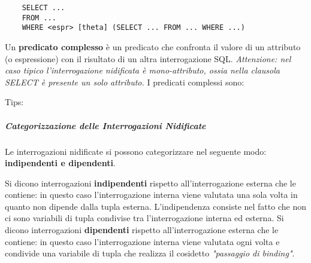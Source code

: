 \documentclass[a4paper]{article}
\begin{document}
	\begin{Verbatim}
	SELECT ...
	FROM ...
	WHERE <espr> [theta] (SELECT ... FROM ... WHERE ...)
	\end{Verbatim}

	Un \textbf{predicato complesso} è un predicato che confronta il valore di un attributo (o espressione) con il risultato di un altra interrogazione SQL.	
	\newline
	\newline
	\emph{Attenzione: nel caso tipico l'interrogazione nidificata è mono-attributo, ossia nella clausola SELECT è presente un solo attributo.}
	\newline
	\newline
	I predicati complessi sono:

	Tips:

	\subparagraph{Categorizzazione delle Interrogazioni Nidificate}
	Le interrogazioni nidificate si possono categorizzare nel seguente modo: \textbf{indipendenti e dipendenti}.

	Si dicono interrogazioni \textbf{indipendenti} rispetto all'interrogazione esterna che le contiene: in questo caso l'interrogazione interna viene valutata
	una sola volta in quanto non dipende dalla tupla esterna. L'indipendenza consiste nel fatto che non ci sono variabili di tupla condivise tra l'interrogazione interna ed esterna.
	\newline
	\newline
	Si dicono interrogazioni \textbf{dipendenti} rispetto all'interrogazione esterna che le contiene: in questo caso l'interrogazione interna viene valutata
	ogni volta e condivide una variabile di tupla che realizza il cosidetto \emph{"passaggio di binding"}.
\end{document}
